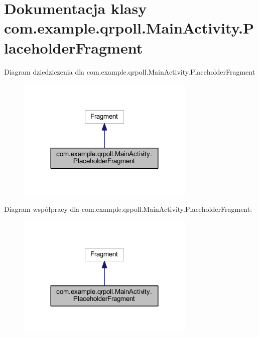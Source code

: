 \hypertarget{classcom_1_1example_1_1qrpoll_1_1_main_activity_1_1_placeholder_fragment}{\section{Dokumentacja klasy com.\+example.\+qrpoll.\+Main\+Activity.\+Placeholder\+Fragment}
\label{classcom_1_1example_1_1qrpoll_1_1_main_activity_1_1_placeholder_fragment}
}


Diagram dziedziczenia dla com.\+example.\+qrpoll.\+Main\+Activity.\+Placeholder\+Fragment\nopagebreak
\begin{figure}[H]
\begin{center}
\leavevmode
\includegraphics[width=240pt]{classcom_1_1example_1_1qrpoll_1_1_main_activity_1_1_placeholder_fragment__inherit__graph}
\end{center}
\end{figure}


Diagram współpracy dla com.\+example.\+qrpoll.\+Main\+Activity.\+Placeholder\+Fragment\+:\nopagebreak
\begin{figure}[H]
\begin{center}
\leavevmode
\includegraphics[width=240pt]{classcom_1_1example_1_1qrpoll_1_1_main_activity_1_1_placeholder_fragment__coll__graph}
\end{center}
\end{figure}
